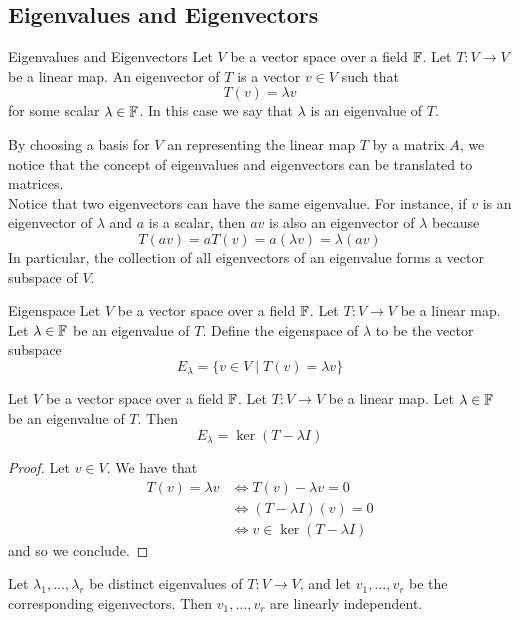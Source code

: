 \documentclass[a4paper]{article}
\begin{document}
\subsection{Eigenvalues and Eigenvectors}
\begin{defn}{Eigenvalues and Eigenvectors}{} Let $V$ be a vector space over a field $\mathbb{F}$. Let $T:V\to V$ be a linear map. An eigenvector of $T$ is a vector $v\in  V$ such that $$T(v)=\lambda v$$ for some scalar $\lambda\in\mathbb{F}$. In this case we say that $\lambda$ is an eigenvalue of $T$. 
\end{defn}

By choosing a basis for $V$ an representing the linear map $T$ by a matrix $A$, we notice that the concept of eigenvalues and eigenvectors can be translated to matrices. \\

Notice that two eigenvectors can have the same eigenvalue. For instance, if $v$ is an eigenvector of $\lambda$ and $a$ is a scalar, then $av$ is also an eigenvector of $\lambda$ because $$T(av)=aT(v)=a(\lambda v)=\lambda(av)$$ In particular, the collection of all eigenvectors of an eigenvalue forms a vector subspace of $V$. 

\begin{defn}{Eigenspace}{} Let $V$ be a vector space over a field $\mathbb{F}$. Let $T:V\to V$ be a linear map. Let $\lambda\in\mathbb{F}$ be an eigenvalue of $T$. Define the eigenspace of $\lambda$ to be the vector subspace $$E_\lambda=\{v\in V\;|\;T(v)=\lambda v\}$$
\end{defn}

\begin{lmm}{}{} Let $V$ be a vector space over a field $\mathbb{F}$. Let $T:V\to V$ be a linear map. Let $\lambda\in\mathbb{F}$ be an eigenvalue of $T$. Then $$E_\lambda=\ker(T-\lambda I)$$ \tcbline
\begin{proof}
Let $v\in V$. We have that 
\begin{align*}
T(v)=\lambda v&\iff T(v)-\lambda v=0\\
&\iff (T-\lambda I)(v)=0\\
&\iff v\in\ker(T-\lambda I)
\end{align*}
and so we conclude. 
\end{proof}
\end{lmm}

\begin{prp}{}{} Let $\lambda_1,\dots,\lambda_r$ be distinct eigenvalues of $T:V\to V$, and let $v_1,\dots,v_r$ be the corresponding eigenvectors. Then $v_1,\dots,v_r$ are linearly independent. 
\end{prp}
\end{document}
